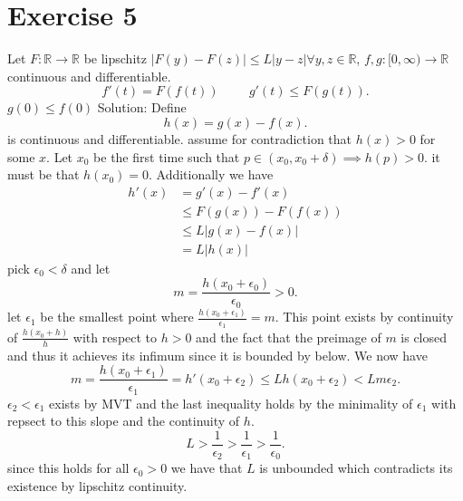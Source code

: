 \documentclass[11pt]{article}
\newcommand{\solution}[1]{{{\textcolor{header}{Solution:} \textcolor{solution}{#1}}}}
\begin{document}
\section{Exercise 5}
Let $F : \mathbb{R} \rightarrow \mathbb{R}$ be lipschitz $|F(y) -F(z)| \le L |y-z| \forall y,z \in \mathbb{R}$, $f,g : [0,\infty) \rightarrow \mathbb{R}$ continuous and differentiable.
\[
    f'(t) = F(f(t)) \hspace{1cm} g'(t) \le F(g(t))
.\] 
$g(0) \le f(0)$
\solution{
    Define
    \[
    h(x) = g(x) - f(x)
    .\] 
    is continuous and differentiable. assume for contradiction that $h(x) > 0$ for some  $x$. Let $x_0$ be the first time such that $p \in (x_0,x_0+\delta) \implies h(p) > 0$.
    it must be that $h(x_0) = 0$. Additionally we have
    \begin{align*}
        h'(x) &= g'(x) - f'(x)\\
              &\le F(g(x)) - F(f(x))\\
              &\le L |g(x)-f(x)|\\
              &= L|h(x)|
    \end{align*}
    pick $\epsilon_0 < \delta$ and let
    \[
    m = \frac{h(x_0+\epsilon_0)}{\epsilon_0} > 0
    .\] 
    let $\epsilon_1$ be the smallest point where $\frac{h(x_0+\epsilon_1)}{\epsilon_1} = m$. This point exists by continuity of $\frac{h(x_0+h)}{h}$ with respect to $h > 0$ and 
    the fact that the preimage of  $m$ is closed and thus it achieves its infimum since it is bounded by below.
    We now have
    \[
        m = \frac{h(x_0+\epsilon_1)}{\epsilon_1} = h'(x_0 + \epsilon_2)\le Lh(x_0+\epsilon_2) < Lm\epsilon_2
    .\] 
    $\epsilon_2 < \epsilon_1$ exists by MVT and the last inequality holds by the minimality of $\epsilon_1$ with repsect to this slope and the continuity of $h$.
    \[
    L > \frac{1}{\epsilon_2} > \frac{1}{\epsilon_1} > \frac{1}{\epsilon_0}
    .\]  
    since this holds for all $\epsilon_0 > 0$ we have that $L$ is unbounded which contradicts its existence by lipschitz continuity.
}
\end{document}
